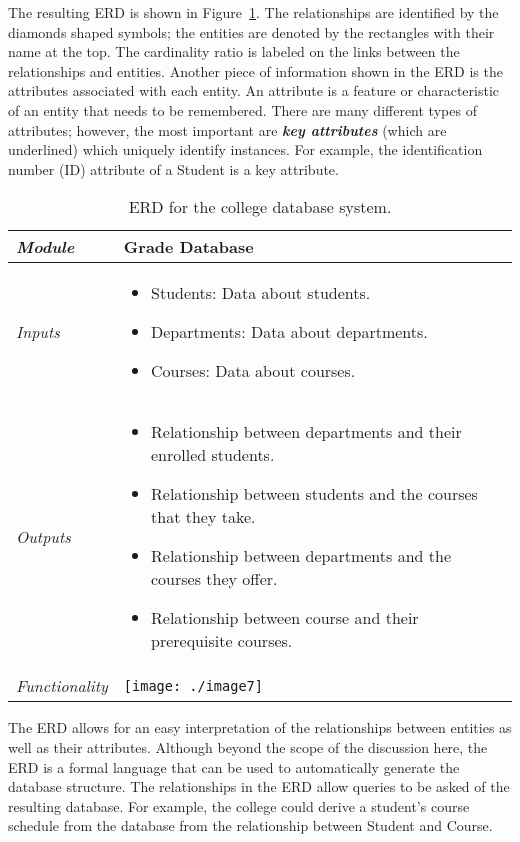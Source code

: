 The resulting ERD is shown in Figure~\ref{table:erdCollegeSystem}. 
The relationships are
identified by the diamonds shaped symbols; the entities are denoted by
the rectangles with their name at the top. The cardinality ratio is
labeled on the links between the relationships and entities. Another
piece of information shown in the ERD is the attributes associated with
each entity. An attribute is a feature or characteristic of an entity
that needs to be remembered. There are many different types of
attributes; however, the most important are \textbf{\emph{key
attributes}} (which are underlined) which uniquely identify instances.
For example, the identification number (ID) attribute of a Student is a
key attribute.


\begin{table}[h]
\caption{ERD for the college database system.}
\label{table:erdCollegeSystem}
\begin{tabular}{|l|m{10cm}|}
\hline
\emph{Module} & Grade Database \\ \hline

\emph{Inputs} & 
\begin{itemize}
\item
  Students: Data about students.
\item
  Departments: Data about departments.
\item
  Courses: Data about courses.
\end{itemize} \\ \hline
\emph{Outputs} & 
\begin{itemize}
\item
  Relationship between departments and their enrolled students.
\item
  Relationship between students and the courses that they take.
\item
  Relationship between departments and the courses they offer.
\item
  Relationship between course and their prerequisite courses.
\end{itemize} \\ \hline
\emph{Functionality} &
\texttt{[image: ./image7]} \\ \hline
\end{tabular}
\end{table}

The ERD allows for an easy interpretation of the relationships between
entities as well as their attributes. Although beyond the scope of the
discussion here, the ERD is a formal language that can be used to
automatically generate the database structure. The relationships in the
ERD allow queries to be asked of the resulting database. For example,
the college could derive a student's course schedule from the database
from the relationship between Student and Course.

